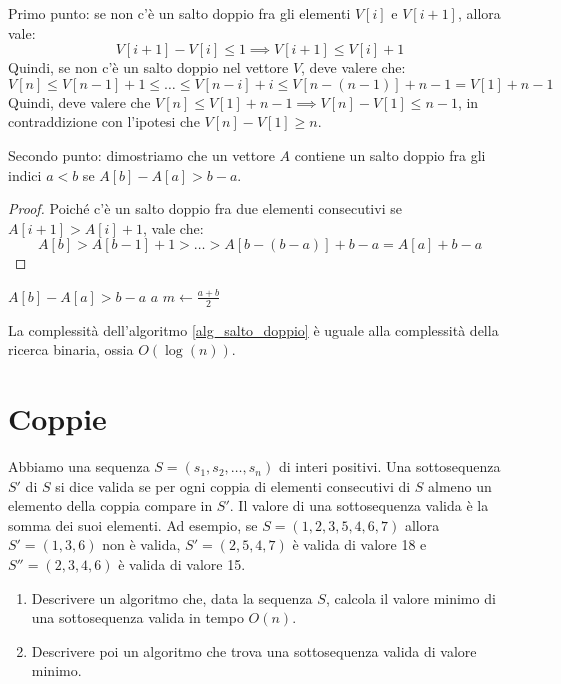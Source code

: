 Primo punto: se non c'\`e un salto doppio fra gli elementi $V[i]$ e $V[i+1]$, allora vale:
\[
V[i+1] - V[i] \le 1 \implies V[i+1] \le V[i] + 1
\]
Quindi, se non c'\`e un salto doppio nel vettore $V$, deve valere che:
\[
V[n] \le V[n-1] + 1 \le \ldots \le V[n - i] + i \le V[n - (n - 1)] + n - 1 = V[1] + n - 1
\]
Quindi, deve valere che $V[n] \le V[1] + n - 1 \implies V[n] - V[1] \le n - 1$, in contraddizione con l'ipotesi che $V[n] - V[1] \ge n$.

Secondo punto: dimostriamo che un vettore $A$ contiene un salto doppio fra gli indici $a < b$ se $A[b] - A[a] > b - a$.

\begin{proof}
Poich\'e c'\`e un salto doppio fra due elementi consecutivi se $A[i+1] > A[i] + 1$, vale che:
\[
A[b] > A[b-1] + 1 > \ldots > A[b - (b - a)] + b - a = A[a] + b - a
\]
\end{proof}

\begin{algorithm}
\begin{algorithmic}
\Require $A[b] - A[a] > b - a$
        \State \Return $a$
    \Else
        \State $m \gets \frac{a + b}{2}$
            \State \Return {}
        \Else
            \State \Return {}
        \EndIf
    \EndIf
\EndFunction
\end{algorithmic}
\caption{\label{alg_salto_doppio}trovare la posizione di un salto doppio in un array ordinato di interi}
\end{algorithm}

La complessit\`a dell'algoritmo \ref{alg_salto_doppio} \`e uguale alla complessit\`a della ricerca binaria, ossia $O\left(\log (n)\right)$.

\clearpage

\section{Coppie}

\begin{esercizio}
Abbiamo una sequenza $S = (s_1,s_2,\ldots,s_n)$ di interi positivi. Una sottosequenza $S'$ di $S$ si dice valida se per ogni coppia di elementi consecutivi di $S$ almeno un elemento della coppia compare in $S'$. Il valore di una sottosequenza valida \`e la somma dei suoi elementi. Ad esempio, se $S = (1,2,3,5,4,6,7)$ allora $S' = (1,3,6)$ non \`e valida, $S' = (2,5,4,7)$ \`e valida di valore 18 e $S'' = (2,3,4,6)$ \`e valida di valore 15.
\begin{enumerate}
    \item Descrivere un algoritmo che, data la sequenza $S$, calcola il valore minimo di una sottosequenza valida in tempo $O(n)$.
    \item Descrivere poi un algoritmo che trova una sottosequenza valida di valore minimo.
\end{enumerate}
\end{esercizio}

